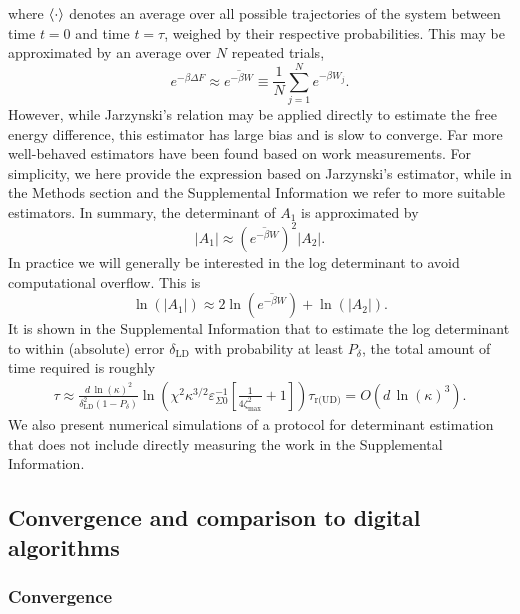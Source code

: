 \documentclass[prx,onecolumn,floatfix,longbibliography,notitlepage, nofootinbib,12pt]{revtex4-2}
\begin{document}
where $\braket{\cdot}$ denotes an average over all possible trajectories of the system between time $t=0$ and time $t=\tau$, weighed by their respective probabilities. This may be approximated by an average over $N$ repeated trials,
\begin{equation}
    e^{-\beta \Delta F}\approx \overline{e^{-\beta W}}  \equiv \frac{1}{N}\sum_{j=1}^N e^{-\beta W_j}.
\end{equation}
However, while Jarzynski's relation may be applied directly to estimate the free energy difference, this estimator has large bias and is slow to converge. Far more well-behaved estimators have been found based on work measurements. For simplicity, we here provide the expression based on Jarzynski's estimator, while in the Methods section and the Supplemental Information we refer to more suitable estimators. In summary, the determinant of $A_1$ is approximated by
\begin{equation}
\left| A_1\right| \approx \left(\overline{e^{-\beta W}}\right)^2 \left| A_2\right|.
\end{equation}
In practice we will generally be interested in the log determinant to avoid computational overflow. This is
\begin{equation}
\ln\left(\left| A_1\right|\right) \approx 2 \ln\left(\overline{e^{-\beta W}}\right)  + \ln\left( \left| A_2\right|\right).
\end{equation}
It is shown in the Supplemental Information that to estimate the log determinant to within (absolute) error $\delta_\text{LD}$ with probability at least $P_\delta$, the total amount of time required is roughly
\begin{align}
\tau \approx \frac{ d\,\ln(\kappa)^2}{\delta^2_\text{LD}(1-P_\delta)} \ln\left(\chi^2 \kappa^{3/2}\varepsilon_{\Sigma0}^{-1}\left[\frac{1}{4\zeta_\text{max}^{2}}+1\right]\right)
\tau_\text{r(UD)} = O(d \, \ln(\kappa)^3).
\end{align}
We also present numerical simulations of a protocol for determinant estimation that does not include directly measuring the work in the Supplemental Information.





\subsection{Convergence and comparison to digital algorithms}

\subsubsection{Convergence}
\end{document}
